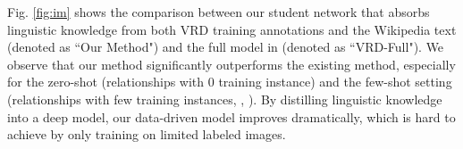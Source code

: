 Fig. \ref{fig:im} shows the comparison between our student network that absorbs linguistic knowledge from both VRD training annotations and the Wikipedia text (denoted as ``Our Method") and the full model in \cite{VRD} (denoted as ``VRD-Full"). We observe that our method significantly outperforms the existing method, especially for the zero-shot (relationships with 0 training instance) and the few-shot setting (relationships with few training instances, \eg, ). By distilling linguistic knowledge into a deep model, our data-driven model improves dramatically, which is hard to achieve by only training on limited labeled images.













